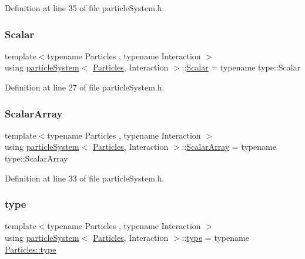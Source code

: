 Definition at line 35 of file particle\+System.\+h.

\mbox{\label{classparticle_system_a3938954186247e3eab01cc75fcc62b40}} 
\subsubsection{\texorpdfstring{Scalar}{Scalar}}
{\footnotesize\ttfamily template$<$typename Particles , typename Interaction $>$ \\
using \mbox{\hyperlink{classparticle_system}{particle\+System}}$<$ \mbox{\hyperlink{struct_particles}{Particles}}, Interaction $>$\+::\mbox{\hyperlink{classparticle_system_a3938954186247e3eab01cc75fcc62b40}{Scalar}} =  typename type\+::\+Scalar}



Definition at line 27 of file particle\+System.\+h.

\mbox{\label{classparticle_system_a7f143d2466bd0f78d79cccd3493a756b}} 
\subsubsection{\texorpdfstring{Scalar\+Array}{ScalarArray}}
{\footnotesize\ttfamily template$<$typename Particles , typename Interaction $>$ \\
using \mbox{\hyperlink{classparticle_system}{particle\+System}}$<$ \mbox{\hyperlink{struct_particles}{Particles}}, Interaction $>$\+::\mbox{\hyperlink{classparticle_system_a7f143d2466bd0f78d79cccd3493a756b}{Scalar\+Array}} =  typename type\+::\+Scalar\+Array}



Definition at line 33 of file particle\+System.\+h.

\mbox{\label{classparticle_system_a7919ed2c8b419f26da20a3bd43ba5fcd}} 
\subsubsection{\texorpdfstring{type}{type}}
{\footnotesize\ttfamily template$<$typename Particles , typename Interaction $>$ \\
using \mbox{\hyperlink{classparticle_system}{particle\+System}}$<$ \mbox{\hyperlink{struct_particles}{Particles}}, Interaction $>$\+::\mbox{\hyperlink{classparticle_system_a7919ed2c8b419f26da20a3bd43ba5fcd}{type}} =  typename \mbox{\hyperlink{class_vel_indep_particles_a0c62b43c2f0a50565e5e06587fddee18}{Particles\+::type}}}



